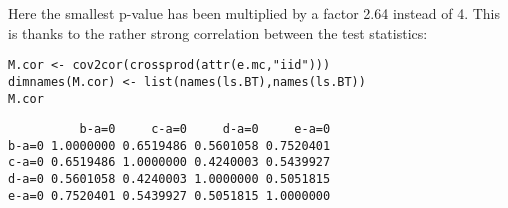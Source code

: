 \documentclass[12pt]{article}
\begin{document}
Here the smallest p-value has been multiplied by a factor 2.64 instead
of 4. This is thanks to the rather strong correlation between the test
statistics:
\lstset{language=r,label= ,caption= ,captionpos=b,numbers=none}
\begin{lstlisting}
M.cor <- cov2cor(crossprod(attr(e.mc,"iid")))
dimnames(M.cor) <- list(names(ls.BT),names(ls.BT))
M.cor
\end{lstlisting}

\begin{verbatim}
          b-a=0     c-a=0     d-a=0     e-a=0
b-a=0 1.0000000 0.6519486 0.5601058 0.7520401
c-a=0 0.6519486 1.0000000 0.4240003 0.5439927
d-a=0 0.5601058 0.4240003 1.0000000 0.5051815
e-a=0 0.7520401 0.5439927 0.5051815 1.0000000
\end{verbatim}
\end{document}
